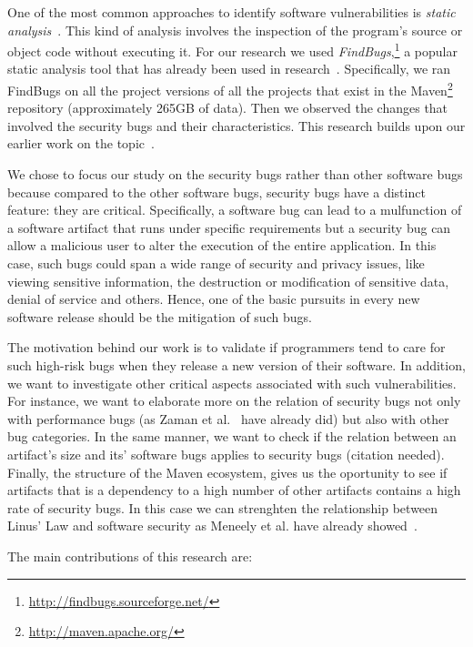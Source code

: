 \documentclass[conference]{IEEEtran}
\begin{document}
One of the most common approaches to identify software vulnerabilities is
{\it static analysis}~\cite{CW07}. This kind of analysis involves the
inspection of the program's source or object code without executing
it. For our research we used {\it FindBugs},\footnote{\url{http://findbugs.sourceforge.net/}}
a popular static analysis tool that has already been used in
research~\cite{AP10, HP07, HP04}. Specifically, we ran FindBugs on all the project
versions of all the projects that exist in the Maven\footnote{\url{http://maven.apache.org/}}
repository (approximately 265GB of data). Then we observed the changes that
involved the security bugs and their characteristics. This research builds upon
our earlier work on the topic~\cite{MGS12}.

We chose to focus our study on the security bugs rather than other
software bugs because compared to the other software bugs,
security bugs have a distinct feature: they are critical. Specifically, a software bug can
lead to a mulfunction of a software artifact that runs under specific
requirements but a security bug can allow a malicious user to alter the
execution of the entire application. In this case, such bugs could span a wide range
of security and privacy issues, like viewing sensitive information, the destruction or
modification of sensitive data, denial of service and others.
Hence, one of the basic pursuits in every new software release should be the
mitigation of such bugs.

The motivation behind our work is to validate if programmers tend to care for
such high-risk bugs when they release a new version of their software. In
addition, we want to investigate other critical aspects associated with such
vulnerabilities. For instance, we want to elaborate more on the relation of security
bugs not only with performance bugs (as Zaman et al.~\cite{ZAH11} have already
did) but also with other bug categories. In the same manner, we want to check
if the relation between an artifact's size and its' software bugs applies 
to security bugs (citation needed). Finally, the structure of the Maven ecosystem,
gives us the oportunity to see if artifacts that is a dependency to a high
number of other artifacts contains a high rate of security bugs. In this case
we can strenghten the relationship between Linus' Law and software security as
Meneely et al. have already showed~\cite{MW10}.

The main contributions of this research are:
\end{document}
